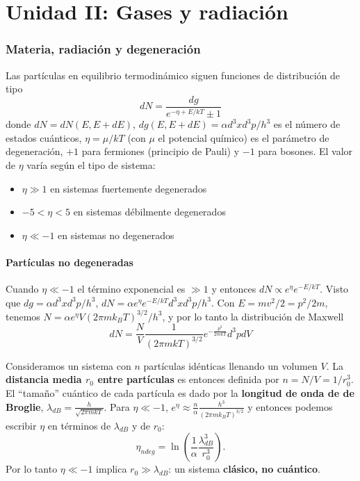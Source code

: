 \documentclass[11pt,letterpaper]{article}
\begin{document}
\section{Unidad II: Gases y radiación}

\subsubsection{Materia, radiación y degeneración}

Las partículas en equilibrio termodinámico siguen funciones de distribución de tipo
\begin{equation}
    dN = \frac{dg}{e^{-\eta + E/kT} \pm 1}
\end{equation}
donde \(dN = dN(E,E+dE)\), \(dg(E,E+dE) = \alpha d^3x d^3p/h^3\) es el número de estados cuánticos, \(\eta = \mu/kT\) (con \(\mu\) el potencial químico) es el parámetro de degeneración, \(+1\) para fermiones (principio de Pauli) y \(-1\) para bosones. El valor de \(\eta\) varía según el tipo de sistema:
\begin{itemize}
    \item \(\eta \gg 1\) en sistemas fuertemente degenerados
    \item \(-5 < \eta < 5\) en sistemas débilmente degenerados
    \item \(\eta \ll -1\) en sistemas no degenerados
\end{itemize}

\paragraph{Partículas no degeneradas}
Cuando \(\eta \ll -1\) el término exponencial es \(\gg 1\) y entonces \(dN \propto e^\eta e^{-E/kT}\). Visto que \(dg = \alpha d^3x d^3p/h^3\), \(dN = \alpha e^\eta e^{-E/kT} d^3x d^3p/h^3\). Con \(E = mv^2/2 = p^2/2m\), tenemos \(N = \alpha e^\eta V(2\pi mk_BT)^{3/2}/h^3\), y por lo tanto la distribución de Maxwell
\begin{equation}
    dN = \frac{N}{V} \frac{1}{(2\pi mkT)^{3/2}} e^{-\frac{p^2}{2mkT}} d^3 p dV
\end{equation}

Consideramos un sistema con \(n\) partículas idénticas llenando un volumen \(V\). La \textbf{distancia media \(r_0\) entre partículas} es entonces definida por \(n = N/V = 1/r_0^3\). El ``tamaño'' cuántico de cada partícula es dado por la \textbf{longitud de onda de de Broglie}, \(\lambda_{dB} = \frac{h}{\sqrt{2\pi mkT}}\). Para \(\eta \ll -1\), \(e^\eta \approx \frac{n}{\alpha} \frac{h^3}{(2\pi m k_B T)^{3/2}}\) y entonces podemos escribir \(\eta\) en términos de \(\lambda_{dB}\) y de \(r_0\):
\begin{equation}
    \eta_{ndeg} = \ln \left( \frac{1}{\alpha} \frac{\lambda_{dB}^3}{r_0^3} \right).
\end{equation}
Por lo tanto \(\eta \ll -1\) implica \(r_0 \gg \lambda_{dB}\): un sistema \textbf{clásico, no cuántico}.
\end{document}
